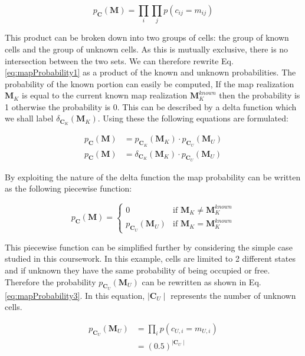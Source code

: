 \documentclass[a4paper,12pt]{article}
\begin{document}
			\begin{equation}
				p_\textbf{C}(\textbf{M}) = \prod_{i} \prod_{j} p(c_{ij} = m_{ij})
				\label{eq:mapProbability1}
			\end{equation}
			
			This product can be broken down into two groups of cells: the group of known cells and the group of unknown cells. As this is mutually exclusive, there is no intersection between the two sets. We can therefore rewrite Eq. \ref{eq:mapProbability1} as a product of the known and unknown probabilities. The probability of the known portion can easily be computed, If the map realization $\textbf{M}_K$ is equal to the current known map realization $\textbf{M}_K^{known}$ then the probability is 1 otherwise the probability is 0. This can be described by a delta function which we shall label $\delta_{\textbf{C}_K}(\textbf{M}_K)$. Using these the following equations are formulated:

			\begin{equation}
				\begin{split}
					p_\textbf{C}(\textbf{M}) &= p_{\textbf{C}_K}(\textbf{M}_K) \cdot p_{\textbf{C}_U}(\textbf{M}_U) \\
					p_\textbf{C}(\textbf{M}) &= \delta_{\textbf{C}_K}(\textbf{M}_K) \cdot p_{\textbf{C}_U}(\textbf{M}_U) 
				\end{split}
				\label{eq:mapProbability2}
			\end{equation}

			By exploiting the nature of the delta function the map probability can be written as the following piecewise function:

			\[
				p_\textbf{C}(\textbf{M}) =
				\begin{cases}
					0 										& \text{if $\textbf{M}_K \neq \textbf{M}_K^{known}$} \\
					p_{\textbf{C}_U}(\textbf{M}_U) 			& \text{if $\textbf{M}_K = \textbf{M}_K^{known}$} 
				\end{cases}
			\]
			
			This piecewise function can be simplified further by considering the simple case studied in this coursework. In this example, cells are limited to 2 different states and if unknown they have the same probability of being occupied or free. Therefore the probability $p_{\textbf{C}_U}(\textbf{M}_U)$ can be rewritten as shown in Eq. \ref{eq:mapProbability3}. In this equation, $\mid \textbf{C}_U \mid$ represents the number of unknown cells. 

			\begin{equation}
				\begin{split}
					p_{\textbf{C}_U}(\textbf{M}_U) &= \prod_{i} p(c_{U,i} = m_{U,i}) \\
					&= \left(0.5\right)^{\mid \textbf{C}_U \mid}
				\end{split}
				\label{eq:mapProbability3}
			\end{equation}
\end{document}
